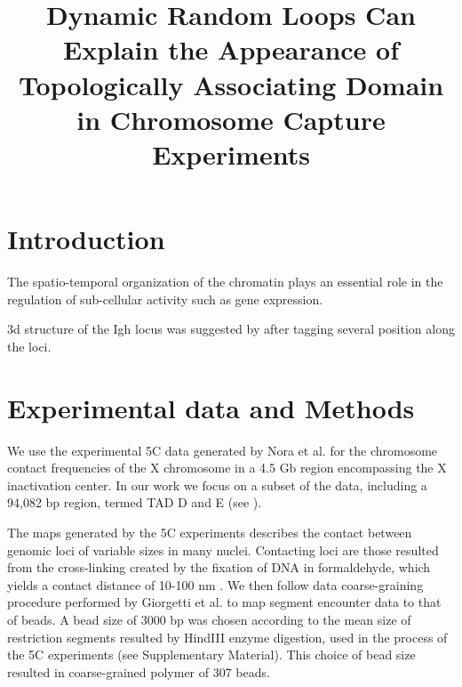 \documentclass[12pt]{paper}
\begin{document}
\title{Dynamic Random Loops Can Explain the Appearance of Topologically Associating Domain in Chromosome Capture Experiments}
\maketitle

\section{Introduction}\label{section_introduction}

The spatio-temporal organization of the chromatin plays an essential role in the regulation of sub-cellular activity \cite{cremer2001chromosome} such as gene expression. 





3d structure of the Igh locus was suggested by \cite{jhunjhunwala20083d} after tagging several position along the loci. 


\section{Experimental data and Methods}\label{section_methods}

We use the experimental 5C data generated by Nora et al.\cite{Nora2012} for the chromosome contact frequencies of the X chromosome in a 4.5 Gb region encompassing the X inactivation center. In our work we focus on a subset of the data, including a 94,082 bp region, termed TAD D and E (see \cite{Nora2012}). 

The maps generated by the 5C experiments describes the contact between genomic loci of variable sizes in many nuclei. Contacting loci are those resulted from the cross-linking created by the fixation of DNA in formaldehyde, which  yields a contact distance of 10-100 nm \cite{dekker2013exploring}. We then follow data coarse-graining procedure performed by Giorgetti et al.\cite{Giorgetti2014} to map segment encounter data to that of beads. A bead size of 3000 bp was chosen according to the mean size of restriction segments resulted by HindIII enzyme digestion, used in the process of the 5C experiments (see \cite{Giorgetti2014} Supplementary Material). This choice of bead size resulted in coarse-grained polymer of 307 beads. 
\end{document}
